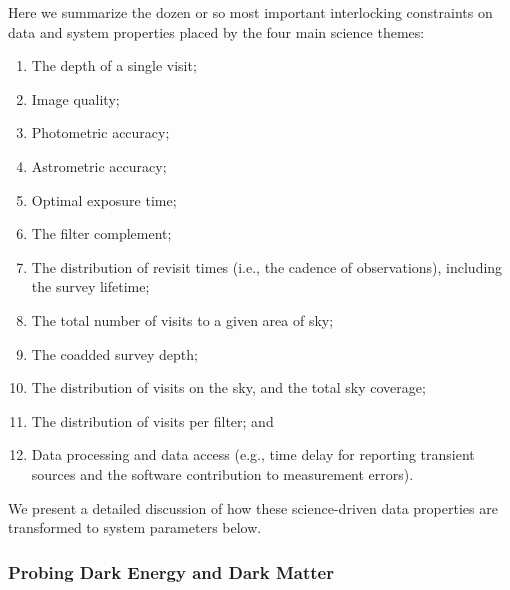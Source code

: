 \documentclass{emulateapj}
\begin{document}
Here we summarize the dozen or so most important interlocking constraints on data 
and system properties placed by the four main science themes: 

\begin{enumerate}
\item  The depth of a single visit;
\item  Image quality;
\item  Photometric accuracy;
\item  Astrometric accuracy;
\item  Optimal exposure time;
\item  The filter complement;
\item  The distribution of revisit times (i.e., the cadence of observations),
       including the survey lifetime;
\item  The total number of visits to a given area of sky;
\item  The coadded survey depth;
\item  The distribution of visits on the sky, and the total sky coverage;
\item  The distribution of visits per filter; and 
\item  Data processing and data access (e.g., time delay for reporting
         transient sources and the software contribution to measurement errors).
\end{enumerate}

We present a detailed discussion of how these science-driven data properties are
transformed to system parameters below. 


\subsubsection{Probing Dark Energy and Dark Matter}
\label{sec:Dark_Energy}
 
\end{document}
